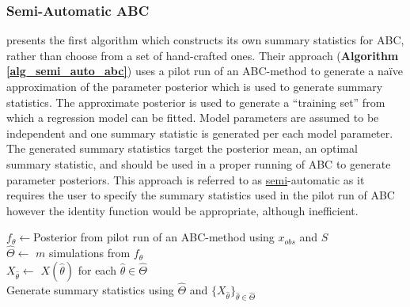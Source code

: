 \documentclass[bibliography=totoc,11pt,a4paper,margin=0]{article}
\theoremstyle{break}
\begin{document}
\subsubsection{Semi-Automatic ABC}\label{sec_semi_automatic_abc}
  \cite[]{constructing_summary_statistics_for_approximate_bayesian_computation_semi_automatic_ABC} presents the first algorithm which constructs its own summary statistics for ABC, rather than choose from a set of hand-crafted ones. Their approach (\textbf{Algorithm \ref{alg_semi_auto_abc}}) uses a pilot run of an ABC-method to generate a na\"ive approximation of the parameter posterior which is used to generate summary statistics. The approximate posterior is used to generate a ``training set'' from which a regression model can be fitted. Model parameters are assumed to be independent and one summary statistic is generated per each model parameter. The generated summary statistics target the posterior mean, an optimal summary statistic, and should be used in a proper running of ABC to generate parameter posteriors. This approach is referred to as \underline{semi}-automatic as it requires the user to specify the summary statistics used in the pilot run of ABC however the identity function would be appropriate, although inefficient.

  \begin{box_algorithm}\label{alg_semi_auto_abc}
    \begin{algorithm}[H]
      $f_\theta\leftarrow$Posterior from pilot run of an ABC-method using $x_{obs}$ and $S$\label{alg_semi_auto_abc_pilot_run}\\
      $\hat\Theta\leftarrow$ $m$ simulations from $f_\theta$\\
      $X_{\hat\theta}\leftarrow$ $X\left(\hat\theta\right)$ for each $\hat\theta\in\hat\Theta$\\
      Generate summary statistics using $\hat\Theta$ and $\{X_{\hat\theta}\}_{\hat\theta\in\hat\Theta}$\label{alg_semi_auto_abc_estimate_ss}
    \end{algorithm}
  \end{box_algorithm}
\end{document}
